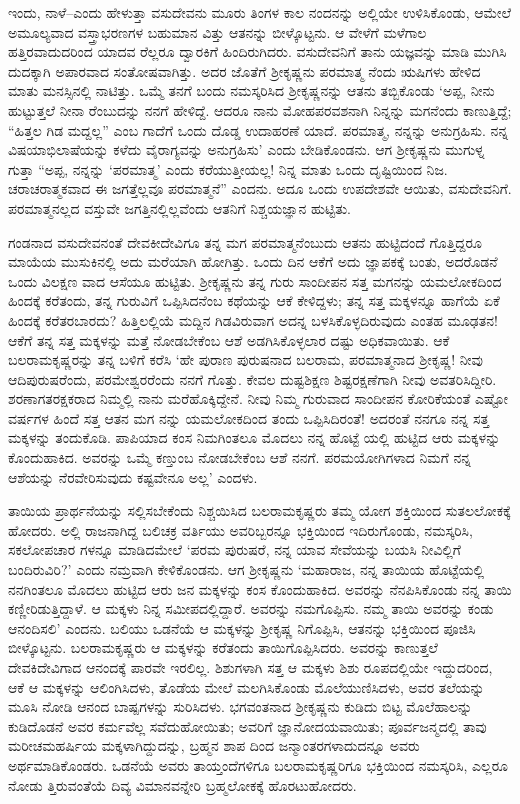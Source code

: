 ಇಂದು, ನಾಳೆ–ಎಂದು ಹೇಳುತ್ತಾ ವಸುದೇವನು ಮೂರು ತಿಂಗಳ ಕಾಲ ನಂದನನ್ನು ಅಲ್ಲಿಯೇ ಉಳಿಸಿಕೊಂಡು, ಆಮೇಲೆ ಅಮೂಲ್ಯವಾದ ವಸ್ತ್ರಾಭರಣಗಳ ಬಹುಮಾನ ವಿತ್ತು ಆತನನ್ನು ಬೀಳ್ಕೊಟ್ಟನು. ಆ ವೇಳೆಗೆ ಮಳೆಗಾಲ ಹತ್ತಿರವಾದುದರಿಂದ ಯಾದವ ರೆಲ್ಲರೂ ದ್ವಾರಕಿಗೆ ಹಿಂದಿರುಗಿದರು. ವಸುದೇವನಿಗೆ ತಾನು ಯಜ್ಞವನ್ನು ಮಾಡಿ ಮುಗಿಸಿ ದುದಕ್ಕಾಗಿ ಅಪಾರವಾದ ಸಂತೋಷವಾಗಿತ್ತು. ಅದರ ಜೊತೆಗೆ ಶ್ರೀಕೃಷ್ಣನು ಪರಮಾತ್ಮ ನೆಂದು ಋಷಿಗಳು ಹೇಳಿದ ಮಾತು ಮನಸ್ಸಿನಲ್ಲಿ ನಾಟಿತ್ತು. ಒಮ್ಮೆ ತನಗೆ ಬಂದು ನಮಸ್ಕರಿಸಿದ ಶ್ರೀಕೃಷ್ಣನನ್ನು ಆತನು ತಬ್ಬಿಕೊಂಡು ‘ಅಪ್ಪ, ನೀನು ಹುಟ್ಟುತ್ತಲೆ ನೀನಾ ರೆಂಬುದನ್ನು ನನಗೆ ಹೇಳಿದ್ದೆ. ಆದರೂ ನಾನು ಮೋಹಪರವಶನಾಗಿ ನಿನ್ನನ್ನು ಮಗನೆಂದು ಕಾಣುತ್ತಿದ್ದೆ; “ಹಿತ್ತಲ ಗಿಡ ಮದ್ದಲ್ಲ” ಎಂಬ ಗಾದೆಗೆ ಒಂದು ದೊಡ್ಡ ಉದಾಹರಣೆ ಯಾದೆ. ಪರಮಾತ್ಮ, ನನ್ನನ್ನು ಅನುಗ್ರಹಿಸು. ನನ್ನ ವಿಷಯಾಭಿಲಾಷೆಯನ್ನು ಕಳೆದು ವೈರಾಗ್ಯವನ್ನು ಅನುಗ್ರಹಿಸು’ ಎಂದು ಬೇಡಿಕೊಂಡನು. ಆಗ ಶ್ರೀಕೃಷ್ಣನು ಮುಗುಳ್ನ ಗುತ್ತಾ “ಅಪ್ಪ, ನನ್ನನ್ನು ‘ಪರಮಾತ್ಮ’ ಎಂದು ಕರೆಯುತ್ತೀಯಲ್ಲ! ನಿನ್ನ ಮಾತು ಒಂದು ದೃಷ್ಟಿಯಿಂದ ನಿಜ. ಚರಾಚರಾತ್ಮಕವಾದ ಈ ಜಗತ್ತೆಲ್ಲವೂ ಪರಮಾತ್ಮನೆ” ಎಂದನು. ಅದೂ ಒಂದು ಉಪದೇಶವೇ ಆಯಿತು, ವಸುದೇವನಿಗೆ. ಪರಮಾತ್ಮನಲ್ಲದ ವಸ್ತುವೇ ಜಗತ್ತಿನಲ್ಲಿಲ್ಲವೆಂದು ಆತನಿಗೆ ನಿಶ್ಚಯಜ್ಞಾನ ಹುಟ್ಟಿತು.

ಗಂಡನಾದ ವಸುದೇವನಂತೆ ದೇವಕೀದೇವಿಗೂ ತನ್ನ ಮಗ ಪರಮಾತ್ಮನೆಂಬುದು ಆತನು ಹುಟ್ಟಿದಂದೆ ಗೊತ್ತಿದ್ದರೂ ಮಾಯೆಯ ಮುಸುಕಿನಲ್ಲಿ ಅದು ಮರೆಯಾಗಿ ಹೋಗಿತ್ತು. ಒಂದು ದಿನ ಆಕೆಗೆ ಅದು ಜ್ಞಾಪಕಕ್ಕೆ ಬಂತು, ಅದರೊಡನೆ ಒಂದು ವಿಲಕ್ಷಣ ವಾದ ಆಸೆಯೂ ಹುಟ್ಟಿತು. ಶ್ರೀಕೃಷ್ಣನು ತನ್ನ ಗುರು ಸಾಂದೀಪನ ಸತ್ತ ಮಗನನ್ನು ಯಮಲೋಕದಿಂದ ಹಿಂದಕ್ಕೆ ಕರೆತಂದು, ತನ್ನ ಗುರುವಿಗೆ ಒಪ್ಪಿಸಿದನೆಂಬ ಕಥೆಯನ್ನು ಆಕೆ ಕೇಳಿದ್ದಳು; ತನ್ನ ಸತ್ತ ಮಕ್ಕಳನ್ನೂ ಹಾಗೆಯೆ ಏಕೆ ಹಿಂದಕ್ಕೆ ಕರೆತರಬಾರದು? ಹಿತ್ತಿಲಲ್ಲಿಯೆ ಮದ್ದಿನ ಗಿಡವಿರುವಾಗ ಅದನ್ನ ಬಳಸಿಕೊಳ್ಳದಿರುವುದು ಎಂತಹ ಮೂಢತನ! ಆಕೆಗೆ ತನ್ನ ಸತ್ತ ಮಕ್ಕಳನ್ನು ಮತ್ತೆ ನೋಡಬೇಕೆಂಬ ಆಶೆ ಅಡಗಿಸಿಕೊಳ್ಳಲಾರ ದಷ್ಟು ಅಧಿಕವಾಯಿತು. ಆಕೆ ಬಲರಾಮಕೃಷ್ಣರನ್ನು ತನ್ನ ಬಳಿಗೆ ಕರೆಸಿ ‘ಹೇ ಪುರಾಣ ಪುರುಷನಾದ ಬಲರಾಮ, ಪರಮಾತ್ಮನಾದ ಶ್ರೀಕೃಷ್ಣ! ನೀವು ಆದಿಪುರುಷರೆಂದು, ಪರಮೇಶ್ವರರೆಂದು ನನಗೆ ಗೊತ್ತು. ಕೇವಲ ದುಷ್ಟಶಿಕ್ಷಣ ಶಿಷ್ಟರಕ್ಷಣೆಗಾಗಿ ನೀವು ಅವತರಿಸಿದ್ದೀರಿ. ಶರಣಾಗತರಕ್ಷಕರಾದ ನಿಮ್ಮಲ್ಲಿ ನಾನು ಮರೆಹೊಕ್ಕಿದ್ದೇನೆ. ನೀವು ನಿಮ್ಮ ಗುರುವಾದ ಸಾಂದೀಪನ ಕೋರಿಕೆಯಂತೆ ಎಷ್ಟೋ ವರ್ಷಗಳ ಹಿಂದೆ ಸತ್ತ ಆತನ ಮಗ ನನ್ನು ಯಮಲೋಕದಿಂದ ತಂದು ಒಪ್ಪಿಸಿದಿರಂತೆ! ಅದರಂತೆ ನನಗೂ ನನ್ನ ಸತ್ತ ಮಕ್ಕಳನ್ನು ತಂದುಕೊಡಿ. ಪಾಪಿಯಾದ ಕಂಸ ನಿಮಗಿಂತಲೂ ಮೊದಲು ನನ್ನ ಹೊಟ್ಟೆ ಯಲ್ಲಿ ಹುಟ್ಟಿದ ಆರು ಮಕ್ಕಳನ್ನು ಕೊಂದುಹಾಕಿದ. ಅವರನ್ನು ಒಮ್ಮೆ ಕಣ್ತುಂಬ ನೋಡಬೇಕೆಂಬ ಆಶೆ ನನಗೆ. ಪರಮಯೋಗಿಗಳಾದ ನಿಮಗೆ ನನ್ನ ಆಶೆಯನ್ನು ನೆರವೇರಿಸುವುದು ಕಷ್ಟವೇನೂ ಅಲ್ಲ’ ಎಂದಳು.

ತಾಯಿಯ ಪ್ರಾರ್ಥನೆಯನ್ನು ಸಲ್ಲಿಸಬೇಕೆಂದು ನಿಶ್ಚಯಿಸಿದ ಬಲರಾಮಕೃಷ್ಣರು ತಮ್ಮ ಯೋಗ ಶಕ್ತಿಯಿಂದ ಸುತಲಲೋಕಕ್ಕೆ ಹೋದರು. ಅಲ್ಲಿ ರಾಜನಾಗಿದ್ದ ಬಲಿಚಕ್ರ ವರ್ತಿಯು ಅವರಿಬ್ಬರನ್ನೂ ಭಕ್ತಿಯಿಂದ ಇದಿರುಗೊಂಡು, ನಮಸ್ಕರಿಸಿ, ಸಕಲೋಪಚಾರ ಗಳನ್ನೂ ಮಾಡಿದಮೇಲೆ ‘ಪರಮ ಪುರುಷರೆ, ನನ್ನ ಯಾವ ಸೇವೆಯನ್ನು ಬಯಸಿ ನೀವಿಲ್ಲಿಗೆ ಬಂದಿರುವಿರಿ?’ ಎಂದು ನಮ್ರವಾಗಿ ಕೇಳಿಕೊಂಡನು. ಆಗ ಶ್ರೀಕೃಷ್ಣನು ‘ಮಹಾರಾಜ, ನನ್ನ ತಾಯಿಯ ಹೊಟ್ಟೆಯಲ್ಲಿ ನನಗಿಂತಲೂ ಮೊದಲು ಹುಟ್ಟಿದ ಆರು ಜನ ಮಕ್ಕಳನ್ನು ಕಂಸ ಕೊಂದುಹಾಕಿದ. ಅವರನ್ನು ನೆನಪಿಸಿಕೊಂಡು ನನ್ನ ತಾಯಿ ಕಣ್ಣೀರಿಡುತ್ತಿದ್ದಾಳೆ. ಆ ಮಕ್ಕಳು ನಿನ್ನ ಸಮೀಪದಲ್ಲಿದ್ದಾರೆ. ಅವರನ್ನು ನಮಗೊಪ್ಪಿಸು. ನಮ್ಮ ತಾಯಿ ಅವರನ್ನು ಕಂಡು ಆನಂದಿಸಲಿ’ ಎಂದನು. ಬಲಿಯು ಒಡನೆಯೆ ಆ ಮಕ್ಕಳನ್ನು ಶ್ರೀಕೃಷ್ಣ ನಿಗೊಪ್ಪಿಸಿ, ಆತನನ್ನು ಭಕ್ತಿಯಿಂದ ಪೂಜಿಸಿ ಬೀಳ್ಕೊಟ್ಟನು. ಬಲರಾಮಕೃಷ್ಣರು ಆ ಮಕ್ಕಳನ್ನು ಕರೆತಂದು ತಾಯಿಗೊಪ್ಪಿಸಿದರು. ಅವರನ್ನು ಕಾಣುತ್ತಲೆ ದೇವಕಿದೇವಿಗಾದ ಆನಂದಕ್ಕೆ ಪಾರವೇ ಇರಲಿಲ್ಲ. ಶಿಶುಗಳಾಗಿ ಸತ್ತ ಆ ಮಕ್ಕಳು ಶಿಶು ರೂಪದಲ್ಲಿಯೇ ಇದ್ದುದರಿಂದ, ಆಕೆ ಆ ಮಕ್ಕಳನ್ನು ಆಲಿಂಗಿಸಿದಳು, ತೊಡೆಯ ಮೇಲೆ ಮಲಗಿಸಿಕೊಂಡು ಮೊಲೆಯುಣಿಸಿದಳು, ಅವರ ತಲೆಯನ್ನು ಮೂಸಿ ನೋಡಿ ಆನಂದ ಬಾಷ್ಪಗಳನ್ನು ಸುರಿಸಿದಳು. ಭಗವಂತನಾದ ಶ್ರೀಕೃಷ್ಣನು ಕುಡಿದು ಬಿಟ್ಟ ಮೊಲೆಹಾಲನ್ನು ಕುಡಿದೊಡನೆ ಅವರ ಕರ್ಮವೆಲ್ಲ ಸವೆದುಹೋಯಿತು; ಅವರಿಗೆ ಜ್ಞಾನೋದಯವಾಯಿತು; ಪೂರ್ವಜನ್ಮದಲ್ಲಿ ತಾವು ಮರೀಚಮಹರ್ಷಿಯ ಮಕ್ಕಳಾಗಿದ್ದುದನ್ನು, ಬ್ರಹ್ಮನ ಶಾಪ ದಿಂದ ಜನ್ಮಾಂತರಗಳಾದುದನ್ನೂ ಅವರು ಅರ್ಥಮಾಡಿಕೊಂಡರು. ಒಡನೆಯೆ ಅವರು ತಾಯ್ತಂದೆಗಳಿಗೂ ಬಲರಾಮಕೃಷ್ಣರಿಗೂ ಭಕ್ತಿಯಿಂದ ನಮಸ್ಕರಿಸಿ, ಎಲ್ಲರೂ ನೋಡು ತ್ತಿರುವಂತೆಯೆ ದಿವ್ಯ ವಿಮಾನವನ್ನೇರಿ ಬ್ರಹ್ಮಲೋಕಕ್ಕೆ ಹೊರಟುಹೋದರು.

